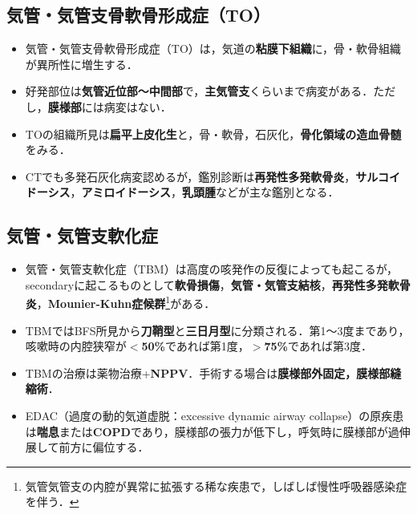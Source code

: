 \subsection{気管・気管支骨軟骨形成症（TO）}

\begin{itemize}

\item 気管・気管支骨軟骨形成症（TO）は，気道の\textbf{粘膜下組織}に，骨・軟骨組織が異所性に増生する．
\item 好発部位は\textbf{気管近位部〜中間部}で，\textbf{主気管支}くらいまで病変がある．ただし，\textbf{膜様部}には病変はない．
\item TOの組織所見は\textbf{扁平上皮化生}と，骨・軟骨，石灰化，\textbf{骨化領域の造血骨髄}をみる．
\item CTでも多発石灰化病変認めるが，鑑別診断は\textbf{再発性多発軟骨炎}，\textbf{サルコイドーシス}，\textbf{アミロイドーシス}，\textbf{乳頭腫}などが主な鑑別となる．


\end{itemize}

\subsection{気管・気管支軟化症}

\begin{itemize}

\item 気管・気管支軟化症（TBM）は高度の咳発作の反復によっても起こるが，secondaryに起こるものとして\textbf{軟骨損傷}，\textbf{気管・気管支結核}，\textbf{再発性多発軟骨炎}，\textbf{Mounier-Kuhn症候群}\footnote{気管気管支の内腔が異常に拡張する稀な疾患で，しばしば慢性呼吸器感染症を伴う．}がある．
\item TBMではBFS所見から\textbf{刀鞘型}と\textbf{三日月型}に分類される．第1〜3度まであり，咳嗽時の内腔狭窄が\textbf{$<$50\%}であれば第1度，\textbf{$>$75\%}であれば第3度．
\item TBMの治療は薬物治療+\textbf{NPPV}．手術する場合は\textbf{膜様部外固定，膜様部縫縮術}．
\item EDAC（過度の動的気道虚脱：excessive dynamic airway collapse）の原疾患は\textbf{喘息}または\textbf{COPD}であり，膜様部の張力が低下し，呼気時に膜様部が過伸展して前方に偏位する．


\end{itemize}

